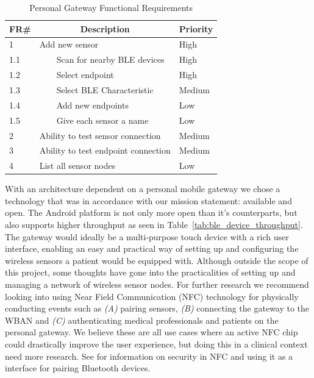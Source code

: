 \begin{table}[]
\centering
\caption{Personal Gateway Functional Requirements}
\label{tab:gatewayRequirements}
\begin{tabular}{|l|l|l|}
\hline
\textbf{FR\#} & \multicolumn{1}{c|}{\textbf{Description}} & \multicolumn{1}{c|}{\textbf{Priority}} \\ \hline
1             & Add new sensor                            & High                                   \\ \hline
1.1           & \ \ \ \ Scan for nearby BLE devices               & High                                   \\ \hline
1.2           & \ \ \ \ Select endpoint                           & High                                   \\ \hline
1.3           & \ \ \ \ Select BLE Characteristic                 & Medium                                 \\ \hline
1.4           & \ \ \ \ Add new endpoints                         & Low                                 \\ \hline
1.5           & \ \ \ \ Give each sensor a name                   & Low                                    \\ \hline
2             & Ability to test sensor connection         & Medium                                 \\ \hline
3             & Ability to test endpoint connection      & Medium                                 \\ \hline
4             & List all sensor nodes                     & Low                                    \\ \hline
\end{tabular}
\end{table}

With an architecture dependent on a personal mobile gateway we chose a technology that was in accordance with our mission statement: available and open. The Android platform is not only more open than it's counterparts, but also supports higher throughput as seen in Table~\ref{tab:ble_device_throughput}.
The gateway would ideally be a multi-purpose touch device with a rich user interface, enabling an easy and practical way of setting up and configuring the wireless sensors a patient would be equipped with. Although outside the scope of this project, some thoughts have gone into the practicalities of setting up and managing a network of wireless sensor nodes. For further research we recommend looking into using Near Field Communication (NFC) technology for physically conducting events such as \emph{(A)} pairing sensors, \emph{(B)} connecting the gateway to the WBAN and \emph{(C)} authenticating medical professionals and patients on the personal gateway. We believe these are all use cases where an active NFC chip could drastically improve the user experience, but doing this in a clinical context need more research. See \cite{atp:2006ue} for information on security in NFC and using it as a interface for pairing Bluetooth devices.

